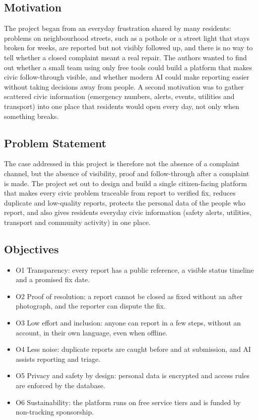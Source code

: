 \documentclass[conference]{IEEEtran}
\begin{document}
\subsection{Motivation}
The project began from an everyday frustration shared by many residents: problems on neighbourhood streets, such as a pothole or a street light that stays broken for weeks, are reported but not visibly followed up, and there is no way to tell whether a closed complaint meant a real repair. The authors wanted to find out whether a small team using only free tools could build a platform that makes civic follow-through visible, and whether modern AI could make reporting easier without taking decisions away from people. A second motivation was to gather scattered civic information (emergency numbers, alerts, events, utilities and transport) into one place that residents would open every day, not only when something breaks.

\subsection{Problem Statement}
The case addressed in this project is therefore not the absence of a complaint channel, but the absence of visibility, proof and follow-through after a complaint is made. The project set out to design and build a single citizen-facing platform that makes every civic problem traceable from report to verified fix, reduces duplicate and low-quality reports, protects the personal data of the people who report, and also gives residents everyday civic information (safety alerts, utilities, transport and community activity) in one place.

\subsection{Objectives}
\begin{itemize}
\item O1 Transparency: every report has a public reference, a visible status timeline and a promised fix date.
\item O2 Proof of resolution: a report cannot be closed as fixed without an after photograph, and the reporter can dispute the fix.
\item O3 Low effort and inclusion: anyone can report in a few steps, without an account, in their own language, even when offline.
\item O4 Less noise: duplicate reports are caught before and at submission, and AI assists reporting and triage.
\item O5 Privacy and safety by design: personal data is encrypted and access rules are enforced by the database.
\item O6 Sustainability: the platform runs on free service tiers and is funded by non-tracking sponsorship.
\end{itemize}
\end{document}
